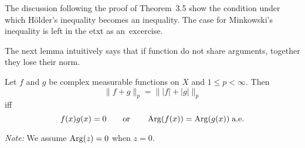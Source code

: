 
The discussion following the proof of Theorem~3.5 \cite{RudinRCA87}
show the condition under which H\"older's inequality becomes an inequality.
The case for Minkowski's  inequality is left in the etxt as an~excercise.

The next lemma intuitively says that if function
do not share arguments, together they lose their norm.
\begin{llem} \label{eq:fgp:leq:afagp}
Let $f$ and $g$ be complex measurable functions on $X$ and \(1\leq p < \infty\).
Then
\begin{equation} \label{eq:fg:absfg}
\|f+g\|_p = \||f|+|g|\|_p
\end{equation}
iff
\begin{equation} \label{eq:argf:argg}
f(x)g(x) = 0 \qquad\textrm{or}\qquad \mathop{\rm Arg}\nolimits(f(x)) = \mathop{\rm Arg}\nolimits(g(x))\;\textrm{a.e.}
\end{equation}
\end{llem}
\emph{Note:} We assume \(\mathop{\rm Arg}\nolimits(z) = 0\) when \(z=0\).\\
